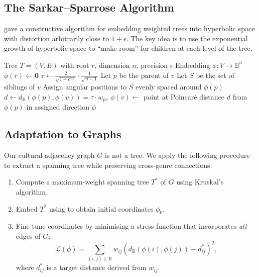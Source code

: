 \documentclass[12pt,a4paper]{article}
\newcommand{\ball}{\mathbb{B}}
\newcommand{\dist}{d_{\ball}}
\begin{document}
\subsection{The Sarkar--Sparrose Algorithm}

\citet{sarkar2011low} gave a constructive algorithm for embedding weighted trees into hyperbolic space with distortion arbitrarily close to $1 + \epsilon$. The key idea is to use the exponential growth of hyperbolic space to ``make room'' for children at each level of the tree.

\begin{algorithm}[htbp]
\caption{Sarkar Hyperbolic Embedding}
\label{alg:sarkar}
\begin{algorithmic}[1]
\REQUIRE Tree $T = (V, E)$ with root $r$, dimension $n$, precision $\epsilon$
\ENSURE Embedding $\phi: V \to \ball^n$
\STATE $\phi(r) \gets \mathbf{0}$
\STATE $\tau \gets \frac{2}{\sqrt{1 - \epsilon^{-2}}} \cdot \frac{1}{\sqrt{n-1}}$ 
  \STATE Let $p$ be the parent of $v$
  \STATE Let $S$ be the set of siblings of $v$
  \STATE Assign angular positions to $S$ evenly spaced around $\phi(p)$
  \STATE $d \gets \dist(\phi(p), \phi(v)) = \tau \cdot w_{pv}$ 
  \STATE $\phi(v) \gets$ point at Poincar\'e distance $d$ from $\phi(p)$ in assigned direction
\ENDFOR
\RETURN $\phi$
\end{algorithmic}
\end{algorithm}

\subsection{Adaptation to Graphs}

Our cultural-adjacency graph $G$ is not a tree. We apply the following procedure to extract a spanning tree while preserving cross-genre connections:

\begin{enumerate}
  \item Compute a maximum-weight spanning tree $T^*$ of $G$ using Kruskal's algorithm.
  \item Embed $T^*$ using  to obtain initial coordinates $\phi_0$.
  \item Fine-tune coordinates by minimising a stress function that incorporates \emph{all} edges of $G$:
  \begin{equation}
    \mathcal{L}(\phi) = \sum_{(i,j) \in E} w_{ij} \left(\dist(\phi(i), \phi(j)) - d^*_{ij}\right)^2,
    \label{eq:stress}
  \end{equation}
  where $d^*_{ij}$ is a target distance derived from $w_{ij}$.
\end{enumerate}
\end{document}
